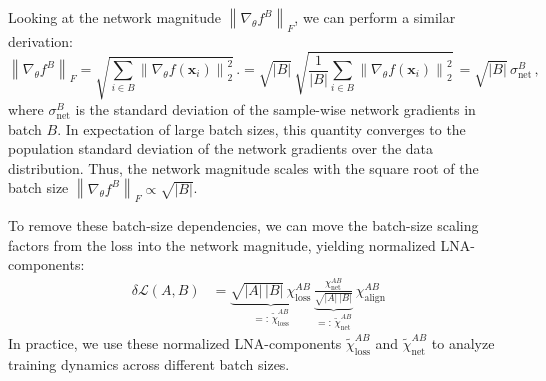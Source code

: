 Looking at the network magnitude \(\left\| \nabla_\theta f^B \right\|_F\), we can perform a similar derivation:
\begin{equation}
    \left\| \nabla_\theta f^B \right\|_F
    = \sqrt{ \sum_{i \in B} \left\| \nabla_{\theta} f(\mathbf{x}_i) \right\|_2^2 } \, .
    = \sqrt{|B|} \, \sqrt{ \frac{1}{|B|} \sum_{i \in B} \left\| \nabla_{\theta} f(\mathbf{x}_i) \right\|_2^2 } \, 
    = \sqrt{|B|} \, \sigma_{\text{net}}^B \, ,
    \label{eq:network_magnitude_batchsize_app}
\end{equation}
where \(\sigma_{\text{net}}^B\) is the standard deviation of the sample-wise network gradients in batch \(B\). In expectation of large batch sizes, this quantity converges to the population standard deviation of the network gradients over the data distribution.
Thus, the network magnitude scales with the square root of the batch size \( \left\| \nabla_\theta f^B \right\|_F \propto \sqrt{|B|} \).

To remove these batch-size dependencies, we can move the batch-size scaling factors from the loss into the network magnitude, yielding normalized LNA-components:
\begin{align}
    \delta \mathcal{L}(A, B) 
    &= \underbrace{\sqrt{|A| \, |B|} \, \chi_{\text{loss}}^{A B}}_{=: \, \tilde{\chi}_{\text{loss}}^{A B}} \,
    \underbrace{\frac{\chi_{\text{net}}^{A B}}{\sqrt{|A| \, |B|}} }_{=: \, \tilde{\chi}_{\text{net}}^{A B}} \,
    \chi_{\text{align}}^{A B} \, 
\end{align}
In practice, we use these normalized LNA-components \(\tilde{\chi}_{\text{loss}}^{A B}\) and \(\tilde{\chi}_{\text{net}}^{A B}\) to analyze training dynamics across different batch sizes.
